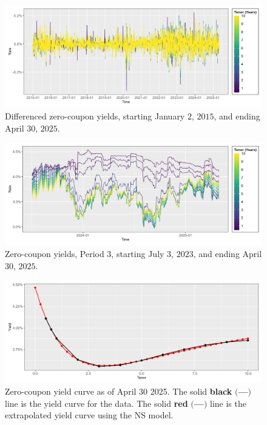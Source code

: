 \newpage

\vfill

\begin{figure}[H]
    \centering
    \includegraphics[width=.95\linewidth]{Figures/Interest Rates/zero_coupon_yields_dates_small_diff_time_plot.png}
    \caption[Differenced Zero-Coupon Yields.]{Differenced zero-coupon yields, starting January $2$, $2015$, and ending April $30$, $2025$.}
    \label{fig:differenced zero-coupon yields time}
\end{figure}

\vfill

\begin{figure}[H]
    \centering
    \includegraphics[width=.95\linewidth]{Figures/Interest Rates/zero_coupon_yields_phase_3_dates_small_time_plot.png}
    \caption[Zero-Coupon Yields, Period 3]{Zero-coupon yields, Period 3, starting July $3$, $2023$, and ending April $30$, $2025$.}
    \label{fig:zero-coupon yields third phase dates time}
\end{figure}

\vfill

\begin{figure}[H]
    \centering
    \includegraphics[width=.95\linewidth]{Figures/Interest Rates/current_zero_coupon_yields_w_extrapolated_curve_yield_curve.png}
    \caption[Current Zero-Coupon Yield Curve.]{Zero-coupon yield curve as of April 30 2025. The solid \textbf{black} $\bigl($\textbf{---}$\bigr)$ line is the yield curve for the data. The solid \textbf{red} $\bigl($\textcolor{red_}{\textbf{---}}$\bigr)$ line is the extrapolated yield curve using the NS model.}
    \label{fig:current zero-coupon yield curve}
\end{figure}

